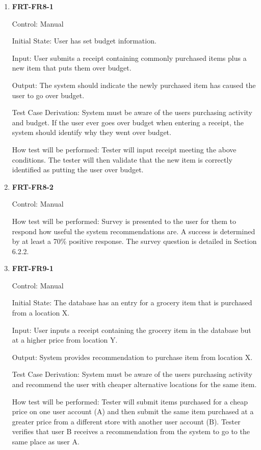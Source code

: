 \documentclass[12pt, titlepage]{article}
\begin{document}
\begin{enumerate}

\item{\textbf{FRT-FR8-1}}

Control: Manual
          
Initial State: User has set budget information.

Input: User submits a receipt containing commonly purchased items plus a new item that puts them over budget.
          
Output: The system should indicate the newly purchased item has caused the user to go over budget.

Test Case Derivation: System must be aware of the users purchasing activity and budget. If the user ever goes over budget when entering
a receipt, the system should identify why they went over budget.
          
How test will be performed: Tester will input receipt meeting the above conditions. The tester will then validate that the new item is correctly identified as putting the user over budget.

\item{\textbf{FRT-FR8-2}}

Control: Manual

How test will be performed: Survey is presented to the user for them to respond how useful the system recommendations are. A success is determined by at least a 70\% positive response. The survey question is detailed in Section 6.2.2.

\item{\textbf{FRT-FR9-1}}

Control: Manual
          
Initial State: The database has an entry for a grocery item that is purchased from a location X.

Input: User inputs a receipt containing the grocery item in the database but at a higher price from location Y.
          
Output: System provides recommendation to purchase item from location X.

Test Case Derivation: System must be aware of the users purchasing activity and recommend the user with cheaper alternative locations for
the same item.
          
How test will be performed: Tester will submit items purchased for a cheap price on one user account (A) and then submit the same item purchased at a greater price from a different store with another user account (B). Tester verifies that user B receives a recommendation from the system to go to the same place as user A.


\end{enumerate}
\end{document}
